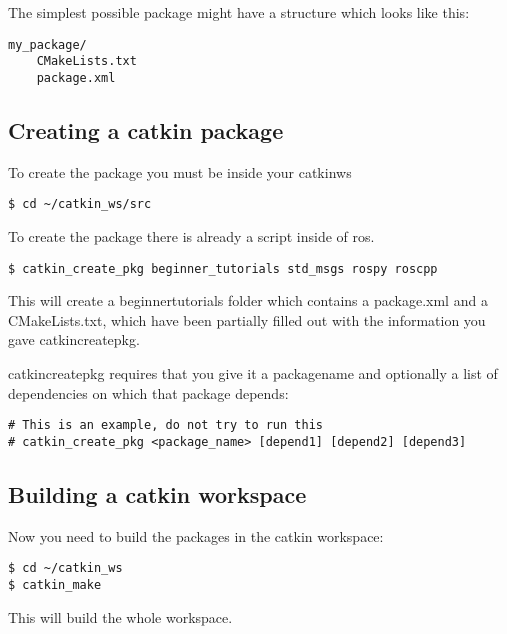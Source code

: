 \noindent The simplest possible package might have a structure which looks like this:

\begin{lstlisting}[breaklines=true languages=bash]
my_package/
	CMakeLists.txt
	package.xml
\end{lstlisting}

\subsection{Creating a catkin package}

To create the package you must be inside your catkin\textunderscore ws
\begin{lstlisting}[breaklines=true languages=bash]
$ cd ~/catkin_ws/src
\end{lstlisting}

\noindent To create the package there is already a script inside of ros.

\begin{lstlisting}[breaklines=true languages=bash]
$ catkin_create_pkg beginner_tutorials std_msgs rospy roscpp
\end{lstlisting}

\noindent This will create a beginner\textunderscore tutorials folder which contains a package.xml and a CMakeLists.txt, which have been partially filled out with the information you gave catkin\textunderscore create\textunderscore pkg.
\newline

\noindent catkin\textunderscore create\textunderscore pkg requires that you give it a package\textunderscore name and optionally a list of dependencies on which that package depends:

\begin{lstlisting}[breaklines=true languages=bash]
# This is an example, do not try to run this
# catkin_create_pkg <package_name> [depend1] [depend2] [depend3]
\end{lstlisting}
\newpage
\pagebreak
\subsection{Building a catkin workspace}
Now you need to build the packages in the catkin workspace:

\begin{lstlisting}[breaklines=true languages=bash]
$ cd ~/catkin_ws
$ catkin_make
\end{lstlisting}

\noindent This will build the whole workspace.

